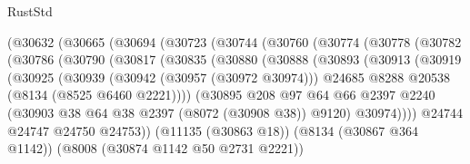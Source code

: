 \begin{lexlean}{RustStd}
\begin{coremodule}
                  (@30632
                    (@30665
                      (@30694
                        (@30723
                          (@30744
                            (@30760
                              (@30774
                                (@30778
                                  (@30782
                                    (@30786
                                      (@30790
                                        (@30817
                                          (@30835
                                            (@30880
                                              (@30888
                                                (@30893
                                                  (@30913
                                                    (@30919
                                                      (@30925
                                                        (@30939
                                                          (@30942 (@30957 (@30972 @30974)))
                                                          @24685
                                                          @8288
                                                          @20538
                                                          (@8134 (@8525 @6460 @2221))))
                                                      (@30895
                                                        @208
                                                        @97
                                                        @64
                                                        @66
                                                        @2397
                                                        @2240
                                                        (@30903
                                                          @38
                                                          @64
                                                          @38
                                                          @2397
                                                          (@8072 (@30908 @38))
                                                          @9120)
                                                        @30974))))
                                                @24744
                                                @24747
                                                @24750
                                                @24753))
                                            (@11135 (@30863 @18))
                                            (@8134 (@30867 @364 @1142))
                                            (@8008 (@30874 @1142 @50 @2731 @2221))

\end{coremodule}
\end{lexlean}
